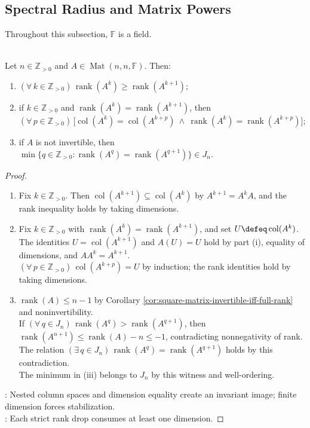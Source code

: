 \subsection{Spectral Radius and Matrix Powers}

Throughout this subsection, $\mathbb{F}$ is a field.

\begin{theorem} \label{thm:ranks-of-matrix-powers-stabilize} \\
Let $n\in\mathbb{Z}_{>0}$ and $A\in\operatorname{Mat}(n,n,\mathbb{F})$. Then:
\begin{enumerate}[label=(\roman*)]
\setlength{\itemsep}{0pt}
\item $(\forall\,k\in\mathbb{Z}_{>0})\,\operatorname{rank}(A^k)\geq\operatorname{rank}(A^{k+1})$;
\item if $k\in\mathbb{Z}_{>0}$ and $\operatorname{rank}(A^k)=\operatorname{rank}(A^{k+1})$, then $(\forall\,p\in\mathbb{Z}_{>0})\,\bigl[\operatorname{col}(A^k)=\operatorname{col}(A^{k+p})\ \land\ \operatorname{rank}(A^k)=\operatorname{rank}(A^{k+p})\bigr]$;
\item if $A$ is not invertible, then $\min\{q\in\mathbb{Z}_{>0}:\operatorname{rank}(A^q)=\operatorname{rank}(A^{q+1})\}\in J_n$.
\end{enumerate}
\begin{proof}
\begin{enumerate}[label=(\roman*)]
\setlength{\itemsep}{0pt}
\item Fix $k\in\mathbb{Z}_{>0}$. Then $\operatorname{col}(A^{k+1})\subseteq\operatorname{col}(A^k)$ by $A^{k+1}=A^kA$, and the rank inequality holds by taking dimensions.
\item Fix $k\in\mathbb{Z}_{>0}$ with $\operatorname{rank}(A^k)=\operatorname{rank}(A^{k+1})$, and set $U\defeq\operatorname{col}(A^k)$.\\
The identities $U=\operatorname{col}(A^{k+1})$ and $A(U)=U$ hold by part (i), equality of dimensions, and $AA^k=A^{k+1}$.\\
$(\forall\,p\in\mathbb{Z}_{>0})\,\operatorname{col}(A^{k+p})=U$ by induction; the rank identities hold by taking dimensions.
\item $\operatorname{rank}(A)\leq n-1$ by Corollary \ref{cor:square-matrix-invertible-iff-full-rank} and noninvertibility.\\
If $(\forall\,q\in J_n)\,\operatorname{rank}(A^q)>\operatorname{rank}(A^{q+1})$, then $\operatorname{rank}(A^{n+1})\leq\operatorname{rank}(A)-n\leq-1$, contradicting nonnegativity of rank.\\
The relation $(\exists\,q\in J_n)\,\operatorname{rank}(A^q)=\operatorname{rank}(A^{q+1})$ holds by this contradiction.\\
The minimum in (iii) belongs to $J_n$ by this witness and well-ordering.
\end{enumerate}
: Nested column spaces and dimension equality create an invariant image; finite dimension forces stabilization.\\
: Each strict rank drop consumes at least one dimension.
\end{proof}
\end{theorem}

